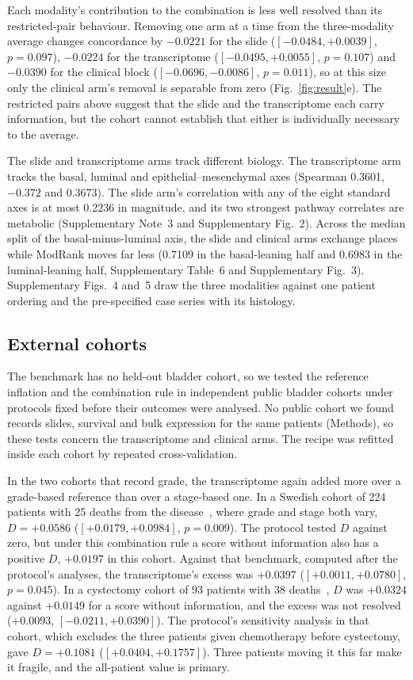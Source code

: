 \documentclass[pdflatex,sn-nature]{sn-jnl}
\begin{document}
Each modality's contribution to the combination is less well resolved than its restricted-pair
behaviour. Removing one arm at a time from the three-modality average changes concordance by
$-0.0221$ for the slide ($[-0.0484, +0.0039]$, $p=0.097$), $-0.0224$ for the transcriptome
($[-0.0495, +0.0055]$, $p=0.107$) and $-0.0390$ for the clinical block ($[-0.0696, -0.0086]$,
$p=0.011$), so at this size only the clinical arm's removal is separable from zero
(Fig.~\ref{fig:result}e). The restricted pairs above suggest that the slide and the transcriptome
each carry information, but the cohort cannot establish that either is individually necessary to the
average.

The slide and transcriptome arms track different biology. The transcriptome arm tracks the basal, luminal and epithelial--mesenchymal axes (Spearman
0.3601, $-0.372$ and 0.3673). The slide arm's correlation with any of the eight standard axes is at
most 0.2236 in magnitude, and its two strongest pathway correlates are metabolic
(Supplementary Note~3 and Supplementary Fig.~2). Across the median split of the
basal-minus-luminal axis, the slide and clinical arms exchange places while ModRank moves far less
(0.7109 in the basal-leaning half and 0.6983 in the luminal-leaning half, Supplementary Table~6 and
Supplementary Fig.~3). Supplementary Figs.~4 and~5
draw the three modalities against one patient ordering and the pre-specified case series with its
histology.

\subsection*{External cohorts}

The benchmark has no held-out bladder cohort, so we tested the reference inflation and the
combination rule in independent public bladder cohorts under protocols fixed before their outcomes
were analysed. No public cohort we found records slides, survival and bulk
expression for the same patients (Methods), so these tests concern the transcriptome and clinical arms. The recipe was refitted inside each cohort by repeated cross-validation.

In the two cohorts that record grade, the transcriptome again added more over a grade-based reference
than over a stage-based one. In a Swedish cohort of 224 patients with 25 deaths from the
disease~\citep{sjodahl2012molecular}, where grade and stage both vary, $D = +0.0586$ ($[+0.0179,
+0.0984]$, $p=0.009$). The protocol tested $D$ against zero, but under this combination rule a score
without information also has a positive $D$, $+0.0197$ in this cohort. Against that benchmark,
computed after the protocol's analyses, the transcriptome's excess was $+0.0397$ ($[+0.0011,
+0.0780]$, $p=0.045$). In a cystectomy cohort of 93 patients with 38
deaths~\citep{riester2012combination}, $D$ was $+0.0324$ against $+0.0149$ for a score without
information, and the excess was not resolved ($+0.0093$, $[-0.0211, +0.0390]$). The protocol's
sensitivity analysis in that cohort, which excludes the three patients given chemotherapy before
cystectomy, gave $D = +0.1081$ ($[+0.0404, +0.1757]$). Three patients moving it this far make it fragile,
and the all-patient value is primary.
\end{document}
